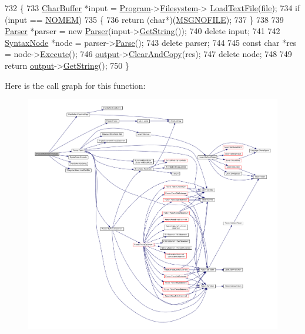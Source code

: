\begin{DoxyCode}
732 \{
733     \hyperlink{classCharBuffer}{CharBuffer} *input = \hyperlink{classProgram}{Program}->\hyperlink{classProgram_a54fb0dc3ee40a356fe91cea64e569b26}{Filesystem}->
      \hyperlink{classFilesystemBase_adc4a9e1dc189bcd221e3b994bc854d46}{LoadTextFile}(\hyperlink{classExecuteStatement_a9565fccd4169cfcbeb8811085bbdeca5}{file});
734     \textcolor{keywordflow}{if} (input == \hyperlink{platform_8h_a46ff2bfbf0d44b8466a2251d5bd5e6f8}{NOMEM})
735     \{
736         \textcolor{keywordflow}{return} (\textcolor{keywordtype}{char}*)(\hyperlink{text_8h_ae0de195e949c617eb8a792aeb4d4574e}{MSGNOFILE});
737     \}
738 
739     \hyperlink{classParser}{Parser} *parser = \textcolor{keyword}{new} \hyperlink{classParser}{Parser}(input->\hyperlink{classCharBuffer_a7dfd3feaaf80f318ba44efe15b1ec44b}{GetString}());
740     \textcolor{keyword}{delete} input;
741 
742     \hyperlink{classSyntaxNode}{SyntaxNode} *node = parser->\hyperlink{classParser_a1861d1d9cc6165970cf07e07cacd11df}{Parse}();
743     \textcolor{keyword}{delete} parser;
744 
745     \textcolor{keyword}{const} \textcolor{keywordtype}{char} *res = node->\hyperlink{classSyntaxNode_ad8418608fa224536b48a590c87f0a509}{Execute}();
746     \hyperlink{classSyntaxNode_a1180628cbe3fce43930cee0df5a9ce5c}{output}->\hyperlink{classCharBuffer_ac52ed7b91190240eb7db4cf43d1e2abb}{ClearAndCopy}(res);
747     \textcolor{keyword}{delete} node;
748 
749     \textcolor{keywordflow}{return} \hyperlink{classSyntaxNode_a1180628cbe3fce43930cee0df5a9ce5c}{output}->\hyperlink{classCharBuffer_a7dfd3feaaf80f318ba44efe15b1ec44b}{GetString}();
750 \}
\end{DoxyCode}


Here is the call graph for this function\+:
\nopagebreak
\begin{figure}[H]
\begin{center}
\leavevmode
\includegraphics[width=350pt]{d4/d99/classExecuteStatement_a8a3bbafeb8739749eab6eaf8a4b9969c_cgraph}
\end{center}
\end{figure}




